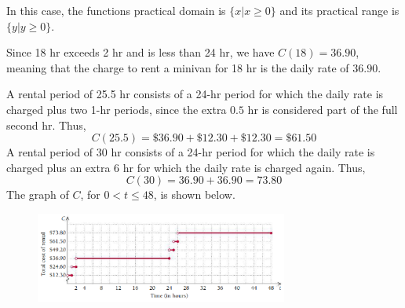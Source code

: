 \documentclass{report}
\begin{document}
\noindent In this case, the functions practical domain is $\{x|x \ge 0\}$ and its practical range is $\{y|y \ge 0\}$.
\pagebreak

\bigbreak \noindent
\sol{}

\bigbreak \noindent
{} Since 18 hr exceeds 2 hr and is less than 24 hr, we have $C(18) = 36.90$, meaning that the charge to rent a minivan for 18 hr is the daily rate of $36.90$.
\vspace{3mm}

\noindent{} A rental period of 25.5 hr consists of a 24-hr period for which the daily rate is charged plus two 1-hr periods, since the extra $0.5$ hr is considered part of the full second hr. Thus,
$$C(25.5) = \$36.90 + \$12.30 + \$12.30 = \$61.50$$
\bigbreak \noindent
{} A rental period of 30 hr consists of a 24-hr period for which the daily rate is charged plus an extra 6 hr for which the daily rate is charged again. Thus,
$$ C(30) = 36.90 + 36.90 = 73.80$$
\bigbreak \noindent
{} The graph of $C$, for $0 < t \le 48$, is shown below.
\vspace{3mm}
\bigbreak \noindent
\begin{figure}[ht]
\centering
\includegraphics[width=0.74\textwidth]{ dgraph.png }
\end{figure}
\bigbreak \noindent
\pagebreak
\end{document}
